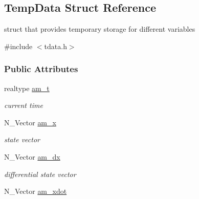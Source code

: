 \hypertarget{struct_temp_data}{}\subsection{Temp\+Data Struct Reference}
\label{struct_temp_data}


struct that provides temporary storage for different variables  




{\ttfamily \#include $<$tdata.\+h$>$}

\subsubsection*{Public Attributes}
\begin{DoxyCompactItemize}
\item 
\hypertarget{struct_temp_data_ae0484650df254ad9cd8883e2ba028892}{}realtype \hyperlink{struct_temp_data_ae0484650df254ad9cd8883e2ba028892}{am\+\_\+t}\label{struct_temp_data_ae0484650df254ad9cd8883e2ba028892}

\begin{DoxyCompactList}\small\item\em current time \end{DoxyCompactList}\item 
\hypertarget{struct_temp_data_a4527d9abde45ba3982c35d2c12969d36}{}N\+\_\+\+Vector \hyperlink{struct_temp_data_a4527d9abde45ba3982c35d2c12969d36}{am\+\_\+x}\label{struct_temp_data_a4527d9abde45ba3982c35d2c12969d36}

\begin{DoxyCompactList}\small\item\em state vector \end{DoxyCompactList}\item 
\hypertarget{struct_temp_data_ac10ec733609d33c557d48c1cc4c9f6f1}{}N\+\_\+\+Vector \hyperlink{struct_temp_data_ac10ec733609d33c557d48c1cc4c9f6f1}{am\+\_\+dx}\label{struct_temp_data_ac10ec733609d33c557d48c1cc4c9f6f1}

\begin{DoxyCompactList}\small\item\em differential state vector \end{DoxyCompactList}\item 
\hypertarget{struct_temp_data_abad4a9e3cc9cd42b3fe4e2fe28a915c1}{}N\+\_\+\+Vector \hyperlink{struct_temp_data_abad4a9e3cc9cd42b3fe4e2fe28a915c1}{am\+\_\+xdot}\label{struct_temp_data_abad4a9e3cc9cd42b3fe4e2fe28a915c1}


\end{DoxyCompactItemize}
